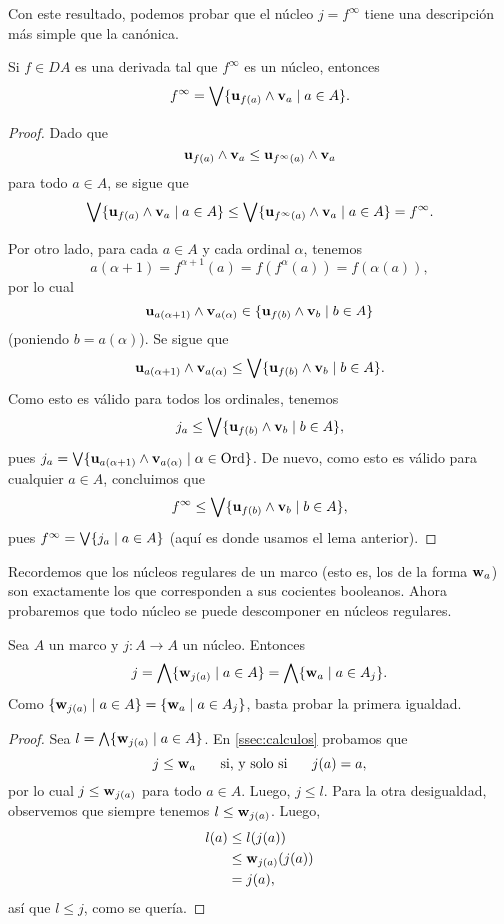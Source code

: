 Con este resultado, podemos probar que el núcleo $j=f^\infty$
tiene una descripción más simple que la canónica.

\begin{lemma}
  Si $f\in DA$ es una derivada tal que $f^\infty$ es un núcleo,
  entonces
  \[
    f^\infty = \bigvee\{\mathbf u_{f(a)}\wedge\mathbf v_{a} \mid a\in A\}
  .\]
\end{lemma}
\begin{proof}
  Dado que
  \[
    \mathbf u_{f(a)}\wedge\mathbf v_{a}\leq \mathbf u_{f^\infty(a)}\wedge\mathbf v_{a}
  \]
  para todo $a\in A$, se sigue que
  \[
    \bigvee\{\mathbf u_{f(a)}\wedge\mathbf v_{a} \mid a\in A\}
    \leq
    \bigvee\{\mathbf u_{f^\infty(a)}\wedge\mathbf v_{a} \mid a\in A\}
    = f^\infty
  .\]

  Por otro lado, para cada $a\in A$ y cada ordinal $\alpha$, tenemos
  \[
    a(\alpha+1)=f^{\alpha+1}(a)=f(f^\alpha(a))=f(\alpha(a))
  ,\]
  por lo cual
  \[
     \mathbf u_{a(\alpha+1)}\wedge\mathbf v_{a(\alpha)}
     \in
     \{\mathbf u_{f(b)}\wedge\mathbf v_{b} \mid b\in A\}
  \]
  (poniendo $b=a(\alpha)$).
  Se sigue que
  \[
     \mathbf u_{a(\alpha+1)}\wedge\mathbf v_{a(\alpha)}
     \leq
     \bigvee\{\mathbf u_{f(b)}\wedge\mathbf v_{b} \mid b\in A\}
  .\]
  Como esto es válido para todos los ordinales, tenemos
  \[
     j_a\leq \bigvee\{\mathbf u_{f(b)}\wedge\mathbf v_{b} \mid b\in A\}
  ,\]
  pues $j_a = \bigvee\{\mathbf u_{a(\alpha+1)}\wedge\mathbf v_{a(\alpha)}
   \mid\alpha\in\mathrm{Ord}\}$.
  De nuevo, como esto es válido para cualquier $a\in A$, concluimos
  que
  \[
     f^\infty\leq \bigvee\{\mathbf u_{f(b)}\wedge\mathbf v_{b} \mid b\in A\}
  ,\]
  pues $f^\infty = \bigvee\{j_a\mid a\in A\}$ (aquí es donde usamos
  el lema anterior).
\end{proof}

Recordemos que los núcleos regulares de un marco
(esto es, los de la forma $\mathbf w_{a}$) son exactamente
los que corresponden a sus cocientes booleanos.
Ahora probaremos que todo núcleo se puede descomponer en
núcleos regulares.

\begin{thm}
    Sea $A$ un marco y $j:A\to A$ un núcleo.
    Entonces
    \[
        j
        = \bigwedge\{\mathbf w_{j(a)}\mid a\in A\}
        = \bigwedge\{\mathbf w_{a}\mid a\in A_j\}
    .\]
    Como $\{\mathbf w_{j(a)}\mid a\in A\}=\{\mathbf w_{a} \mid a\in A_j\}$,
    basta probar la primera igualdad.
\end{thm}
\begin{proof}
    Sea $l = \bigwedge\{\mathbf w_{j(a)}\mid a\in A\}$.
    En \ref{ssec:calculos} probamos que
    \[
        j\leq\mathbf w_{a} \hspace{5mm}\text{ si, y solo si }\hspace{5mm} j(a) = a
    ,\]
    por lo cual $j\leq \mathbf w_{j(a)}$ para todo $a\in A$.
    Luego, $j\leq l$.
    Para la otra desigualdad,
    observemos que siempre tenemos $l\leq\mathbf w_{j(a)}$.
    Luego,
    \begin{align*}
        l(a)
        &\leq l(j(a)) \\
        &\leq \mathbf w_{j(a)}(j(a)) \\
        &= j(a),
    \end{align*}
    así que $l\leq j$, como se quería.
\end{proof}


